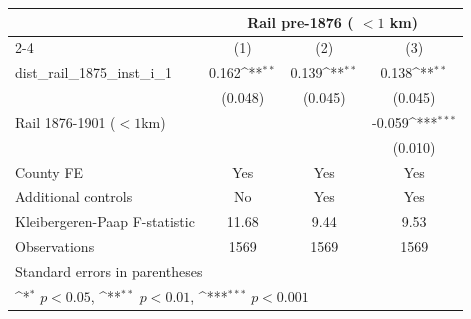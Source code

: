 {
\def\sym#1{\ifmmode^{#1}\else\(^{#1}\)\fi}
\begin{tabular}{l*{3}{c}}
\toprule
                &\multicolumn{3}{c}{Rail pre-1876 ( $<1$ km)}            \\\cmidrule(lr){2-4}
                &\multicolumn{1}{c}{(1)}         &\multicolumn{1}{c}{(2)}         &\multicolumn{1}{c}{(3)}         \\
\midrule
dist\_rail\_1875\_inst\_i\_1&    0.162\sym{**} &    0.139\sym{**} &    0.138\sym{**} \\
                &  (0.048)         &  (0.045)         &  (0.045)         \\
Rail 1876-1901 ($<1$km)&                  &                  &   -0.059\sym{***}\\
                &                  &                  &  (0.010)         \\
County FE       &      Yes         &      Yes         &      Yes         \\
Additional controls &       No         &      Yes         &      Yes         \\
\midrule
Kleibergeren-Paap F-statistic&    11.68         &     9.44         &     9.53         \\
Observations    &     1569         &     1569         &     1569         \\
\bottomrule
\multicolumn{4}{l}{\footnotesize Standard errors in parentheses}\\
\multicolumn{4}{l}{\footnotesize \sym{*} \(p<0.05\), \sym{**} \(p<0.01\), \sym{***} \(p<0.001\)}\\
\end{tabular}
}
